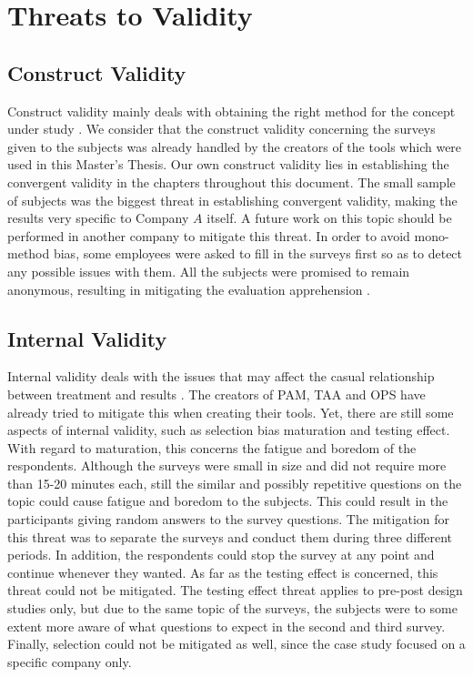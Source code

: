 \section{Threats to Validity}

\subsection{Construct Validity}
Construct validity mainly deals with obtaining the right method for the concept under study \cite{wohlin2012expse}. We consider that the construct validity concerning the surveys given to the subjects was already handled by the creators of the tools which were used in this Master's Thesis. Our own construct validity lies in establishing the convergent validity in the chapters throughout this document. The small sample of subjects was the biggest threat in establishing convergent validity, making the results very specific to Company $A$ itself. A future work on this topic should be performed in another company to mitigate this threat. In order to avoid mono-method bias, some employees were asked to fill in the surveys first so as to detect any possible issues with them. All the subjects were promised to remain anonymous, resulting in mitigating the evaluation apprehension \cite{wohlin2012expse}. 

\subsection{Internal Validity}
Internal validity deals with the issues that may affect the casual relationship between treatment and results \cite{wohlin2012expse}. The creators of \ac{PAM}, \ac{TAA} and \ac{OPS} have already tried to mitigate this when creating their tools. Yet, there are still some aspects of internal validity, such as selection bias maturation and testing effect. With regard to maturation, this concerns the fatigue and boredom of the respondents. Although the surveys were small in size and did not require more than 15-20 minutes each, still the similar and possibly repetitive questions on the topic could cause fatigue and boredom to the subjects. This could result in the participants giving random answers to the survey questions. The mitigation for this threat was to separate the surveys and conduct them during three different periods. In addition, the respondents could stop the survey at any point and continue whenever they wanted. As far as the testing effect is concerned, this threat could not be mitigated. The testing effect threat applies to pre-post design studies only, but due to the same topic of the surveys, the subjects were to some extent more aware of what questions to expect in the second and third survey. Finally, selection could not be mitigated as well, since the case study focused on a specific company only.


